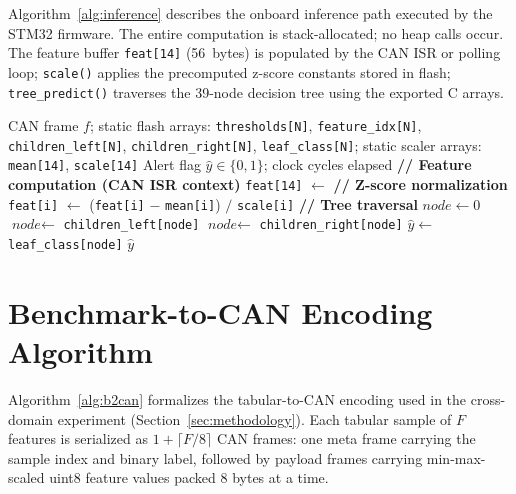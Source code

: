 Algorithm~\ref{alg:inference} describes the onboard inference path executed by the STM32 firmware. The entire computation is stack-allocated; no heap calls occur. The feature buffer \texttt{feat[14]} (56~bytes) is populated by the CAN ISR or polling loop; \texttt{scale()} applies the precomputed z-score constants stored in flash; \texttt{tree\_predict()} traverses the 39-node decision tree using the exported C arrays.

\begin{algorithm}[t]
\caption{CAN IDS Inference (STM32)}
\label{alg:inference}
\begin{algorithmic}[1]
\Require CAN frame $f$; static flash arrays: \texttt{thresholds[N]}, \texttt{feature\_idx[N]},
         \texttt{children\_left[N]}, \texttt{children\_right[N]}, \texttt{leaf\_class[N]};
         static scaler arrays: \texttt{mean[14]}, \texttt{scale[14]}
\Ensure Alert flag $\hat{y} \in \{0,1\}$; clock cycles elapsed
\State \textbf{// Feature computation (CAN ISR context)}
\State \texttt{feat[14]} $\leftarrow$ 
\State \textbf{// Z-score normalization}
    \State \texttt{feat[i]} $\leftarrow$ (\texttt{feat[i]} $-$ \texttt{mean[i]}) $/$ \texttt{scale[i]}
\EndFor
\State \textbf{// Tree traversal}
\State $\textit{node} \leftarrow 0$
  
        \State $\textit{node} \leftarrow$ \texttt{children\_left[node]}
    \Else
        \State $\textit{node} \leftarrow$ \texttt{children\_right[node]}
    \EndIf
\EndWhile
\State $\hat{y} \leftarrow$ \texttt{leaf\_class[node]}
    \State {} 
\EndIf
\State \Return $\hat{y}$
\end{algorithmic}
\end{algorithm}

\section{Benchmark-to-CAN Encoding Algorithm}
\label{app:b2can}

Algorithm~\ref{alg:b2can} formalizes the tabular-to-CAN encoding used in the cross-domain experiment (Section~\ref{sec:methodology}). Each tabular sample of $F$ features is serialized as $1 + \lceil F/8 \rceil$ CAN frames: one meta frame carrying the sample index and binary label, followed by payload frames carrying min-max-scaled uint8 feature values packed 8 bytes at a time.

